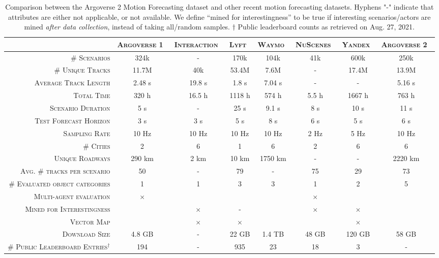 \begin{table}[t]
	\caption{Comparison between the Argoverse 2 Motion Forecasting dataset and other recent motion forecasting datasets. Hyphens "-" indicate that attributes are either not applicable, or not available. We define ``mined for interestingness'' to be true if interesting scenarios/actors are mined \textit{after data collection}, instead of taking all/random samples. $\dagger$ Public leaderboard counts as retrieved on Aug. 27, 2021.}
	\label{forecasting-comparison}
	\centering
	\begin{adjustbox}{max width=\columnwidth}
		\begingroup
		\renewcommand{\arraystretch}{1.25} %
		\begin{tabular}{rccccccc}
			\toprule
			& \textsc{Argoverse 1}~\cite{chang2019argoverse} & \textsc{Interaction}~\cite{zhan2019interaction} & \textsc{Lyft}~\cite{john2020one} & \textsc{Waymo}~\cite{ettinger2021large} & \textsc{NuScenes}~\cite{caesar2020nuscenes} & \textsc{Yandex}~\cite{malinin2021shifts} & \textsc{Argoverse 2}~\cite{malinin2021shifts} \\
			\midrule
			\textsc{\# Scenarios} & 324k & - & 170k & 104k & 41k & 600k & 250k \\
			\textsc{\# Unique Tracks} & 11.7M  & 40k & 53.4M & 7.6M & - & 17.4M & 13.9M  \\
			\textsc{Average Track Length} & 2.48 s & 19.8 s & 1.8 s & 7.04 s & - & - & 5.16 s  \\
			\textsc{Total Time} & 320 h & 16.5 h & 1118 h & 574 h & 5.5 h & 1667 h & 763 h \\
			\textsc{Scenario Duration} & 5 s & - & 25 s & 9.1 s & 8 s & 10 s & 11 s \\
			\textsc{Test Forecast Horizon} & 3 s & 3 s & 5 s & 8 s & 6 s & 5 s & 6 s \\
			\textsc{Sampling Rate} & 10 Hz & 10 Hz & 10 Hz & 10 Hz & 2 Hz & 5 Hz & 10 Hz \\
			\textsc{\# Cities} & 2 & 6 & 1 & 6 & 2 & 6 & 6  \\
			\textsc{Unique Roadways} & 290 km & 2 km & 10 km & 1750 km & - & - & 2220 km \\
			\textsc{Avg. \# tracks per scenario} & 50 & - & 79 & - & 75 & 29 & 73\\
			\textsc{\# Evaluated object categories} & 1 & 1 & 3 & 3 & 1 & 2 & 5 \\
			\textsc{Multi-agent evaluation} & $\times$ & \checkmark & \checkmark & \checkmark & $\times$ & \checkmark &\checkmark \\
			\textsc{Mined for Interestingness} & \checkmark & $\times$ & - & \checkmark & $\times$ & $\times$ & \checkmark \\
			\textsc{Vector Map} & \checkmark & $\times$ & $\times$ & \checkmark & \checkmark & $\times$ &\checkmark \\
			\textsc{Download Size} & 4.8 GB  & -  & 22 GB  & 1.4 TB  & 48 GB & 120 GB & 58 GB \\
			\textsc{\# Public Leaderboard Entries}$^\dagger$ & 194  & -  & 935  & 23 & 18 & 3 & - \\
			\bottomrule
		\end{tabular}
		\endgroup
	\end{adjustbox}
\end{table}

